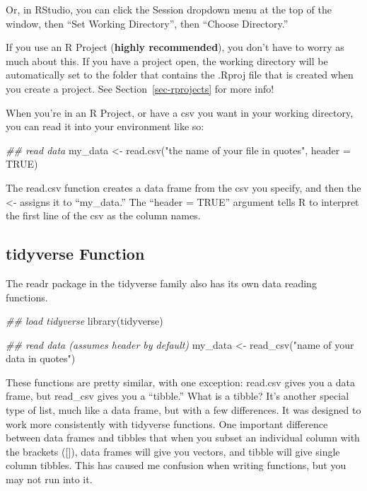\documentclass[
  letterpaper,
  DIV=11,
  numbers=noendperiod]{scrreprt}
\newenvironment{Shaded}{\begin{snugshade}}{\end{snugshade}}
\newcommand{\AttributeTok}[1]{\textcolor[rgb]{0.40,0.45,0.13}{#1}}
\newcommand{\ConstantTok}[1]{\textcolor[rgb]{0.56,0.35,0.01}{#1}}
\newcommand{\DocumentationTok}[1]{\textcolor[rgb]{0.37,0.37,0.37}{\textit{#1}}}
\newcommand{\FunctionTok}[1]{\textcolor[rgb]{0.28,0.35,0.67}{#1}}
\newcommand{\NormalTok}[1]{\textcolor[rgb]{0.00,0.23,0.31}{#1}}
\newcommand{\OtherTok}[1]{\textcolor[rgb]{0.00,0.23,0.31}{#1}}
\newcommand{\StringTok}[1]{\textcolor[rgb]{0.13,0.47,0.30}{#1}}
\begin{document}
Or, in RStudio, you can click the Session dropdown menu at the top of
the window, then ``Set Working Directory'', then ``Choose Directory.''

If you use an R Project (\textbf{highly recommended}), you don't have to
worry as much about this. If you have a project open, the working
directory will be automatically set to the folder that contains the
.Rproj file that is created when you create a project. See
Section~\ref{sec-rprojects} for more info!

When you're in an R Project, or have a csv you want in your working
directory, you can read it into your environment like so:

\begin{Shaded}
\begin{Highlighting}[]
\DocumentationTok{\#\# read data}
\NormalTok{my\_data }\OtherTok{\textless{}{-}} \FunctionTok{read.csv}\NormalTok{(}\StringTok{"the name of your file in quotes"}\NormalTok{, }\AttributeTok{header =} \ConstantTok{TRUE}\NormalTok{)}
\end{Highlighting}
\end{Shaded}

The read.csv function creates a data frame from the csv you specify, and
then the \textless- assigns it to ``my\_data.'' The ``header = TRUE''
argument tells R to interpret the first line of the csv as the column
names.

\subsection{tidyverse Function}\label{tidyverse-function}

The readr package in the tidyverse family also has its own data reading
functions.

\begin{Shaded}
\begin{Highlighting}[]
\DocumentationTok{\#\# load tidyverse}
\FunctionTok{library}\NormalTok{(tidyverse)}

\DocumentationTok{\#\# read data (assumes header by default)}
\NormalTok{my\_data }\OtherTok{\textless{}{-}} \FunctionTok{read\_csv}\NormalTok{(}\StringTok{"name of your data in quotes"}\NormalTok{)}
\end{Highlighting}
\end{Shaded}

These functions are pretty similar, with one exception: read.csv gives
you a data frame, but read\_csv gives you a ``tibble.'' What is a
tibble? It's another special type of list, much like a data frame, but
with a few differences. It was designed to work more consistently with
tidyverse functions. One important difference between data frames and
tibbles that when you subset an individual column with the brackets
({[}{]}), data frames will give you vectors, and tibble will give single
column tibbles. This has caused me confusion when writing functions, but
you may not run into it.
\end{document}
